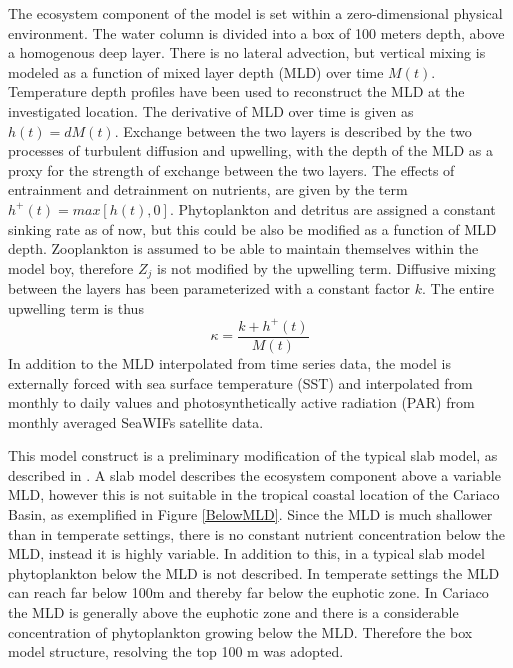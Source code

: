 The ecosystem component of the model is set within a zero-dimensional physical environment. The water column is divided into a box of 100 meters depth, above a homogenous deep layer. There is no lateral advection, but vertical mixing is modeled as a function of mixed layer depth (MLD) over time $M(t)$. Temperature depth profiles have been used to reconstruct the MLD at the investigated location. The derivative of MLD over time is given as $h(t) = dM(t)$. Exchange between the two layers is described by the two processes of turbulent diffusion and upwelling, with the depth of the MLD as a proxy for the strength of exchange between the two layers. The effects of entrainment and detrainment on nutrients, are given by the term $h^{+}(t)= max[h(t),0]$. Phytoplankton and detritus are assigned a constant sinking rate as of now, but this could be also be modified as a function of MLD depth. Zooplankton is assumed to be able to maintain themselves within the model boy, therefore $Z_j$ is not modified by the upwelling term. Diffusive mixing between the layers has been parameterized with a constant factor $k$. The entire upwelling term is thus
\begin{equation}
\kappa = \frac{k + h^{+}(t)}{M(t)}
\end{equation}
In addition to the MLD interpolated from time series data, the model is externally forced with sea surface temperature (SST) and interpolated from monthly to daily values and photosynthetically active radiation (PAR) from monthly averaged SeaWIFs satellite data.

This model construct is a preliminary modification of the typical slab model, as described in \citet{Anderson2015}. A slab model describes the ecosystem component above a variable MLD, however this is not suitable in the tropical coastal location of the Cariaco Basin, as exemplified in Figure \ref{BelowMLD}. Since the MLD is much shallower than in temperate settings, there is no constant nutrient concentration below the MLD, instead it is highly variable. In addition to this, in a typical slab model phytoplankton below the MLD is not described. In temperate settings the MLD can reach far below 100m and thereby far below the euphotic zone. In Cariaco the MLD is generally above the euphotic zone and there is a considerable concentration of phytoplankton growing below the MLD. Therefore the box model structure, resolving the top 100 m was adopted.


